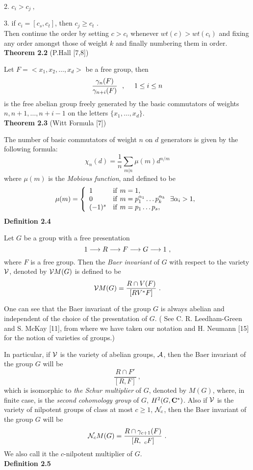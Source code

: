  2. $c_i>c_j\ ,$

 3. if $c_i=[c_s,c_t]$, then $c_j\geq c_t$ .\\
Then continue the order by setting $c>c_i$ whenever $wt(c)>wt(c_i)$ and
fixing any order amongst those of weight $k$ and finally numbering them in
order.\\
{\bf Theorem 2.2} (P.Hall [7,8])

 Let $F=<x_1,x_2,\ldots ,x_d>$ be a free group, then
$$ \frac {\gamma_n(F)}{\gamma_{n+i}(F)} \ \ , \ \ \ \  1\leq i\leq n$$
is the free abelian group freely generated by the basic commutators of weights
$n,n+1,\ldots ,n+i-1$ on the letters $\{x_1,\ldots ,x_d\}.$\\
{\bf Theorem 2.3} (Witt Formula [7])

 The number of basic commutators of weight $n$ on $d$ generators is  given
by the following formula:
$$ \chi_n(d)=\frac {1}{n} \sum_{m|n}^{} \mu (m)d^{n/m}$$
where $\mu (m)$ is the {\it Mobious function}, and defined to be
   \[ \mu (m)=\left \{ \begin{array}{ll}
      1 & {\rm if}\ m=1, \\ 0 & {\rm if}\ m=p_1^{\alpha_1}\ldots
p_k^{\alpha_k}\ \ \exists \alpha_i>1, \\ (-1)^s & {\rm if}\ m=p_1\ldots p_s,
\end{array} \right.  \]
{\bf Definition 2.4}

 Let $G$ be a group with a free presentation
             $$ 1\longrightarrow R\longrightarrow F\longrightarrow G\longrightarrow 1\ , $$
where $F$ is a free group. Then the {\it Baer invariant} of $G$ with respect
to the variety $\cal V$, denoted by ${\cal V}M(G)$ is defined to be
$$ {\cal V}M(G)=\frac {R\cap V(F)}{[RV^*F]}\ . $$

 One can see that the Baer invariant of the group $G$ is always abelian and
independent of the choice of the presentation of $G$.
( See C. R. Leedham-Green and S. McKay [11], from where we have taken our
notation and H. Neumann [15] for the notion of varieties of groups.)

 In particular, if $\cal V$ is the variety of abelian groups, $\cal A$, then the
Baer invariant of the group $G$ will be
  $$ \frac {R\cap F'}{[R,F]}\ , $$
which is isomorphic to {\it the Schur multiplier} of $G$,
denoted by $M(G)$, where, in finite case, is the {\it second cohomology group}
of $G$, $H^2(G,{\bf C}^*)$. Also if $\cal V$ is the
variety of nilpotent groups of class at most $c\geq 1$, ${\cal N}_c$, then the
Baer invariant of the group $G$ will be
  $$ {\cal N}_cM(G)=\frac {R\cap \gamma_{c+1}(F)}{[R,\ _cF]}\ .$$
We also call it the $c$-nilpotent multiplier of $G$.\\
{\bf Definition 2.5}

